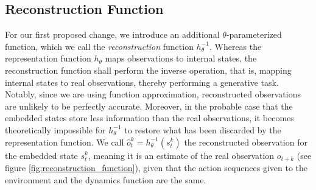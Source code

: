 \newcommand{\reconstruction}{h^{-1}}

\subsection{Reconstruction Function}
For our first proposed change, we introduce an additional $\theta$-parameterized function, which we call the \textit{reconstruction} function $\reconstruction_\theta$. Whereas the representation function $h_\theta$ maps observations to internal states, the reconstruction function shall perform the inverse operation, that is, mapping internal states to real observations, thereby performing a generative task. Notably, since we are using function approximation, reconstructed observations are unlikely to be perfectly accurate. Moreover, in the probable case that the embedded states store less information than the real observations, it becomes theoretically impossible for $\reconstruction_\theta$ to restore what has been discarded by the representation function. We call $\hat{o}^k_t = \reconstruction_\theta(s^k_t)$ the reconstructed observation for the embedded state $s^k_t$, meaning it is an estimate of the real observation $o_{t+k}$ (see figure \ref{fig:reconstruction_function}), given that the action sequences given to the environment and the dynamics function are the same.
